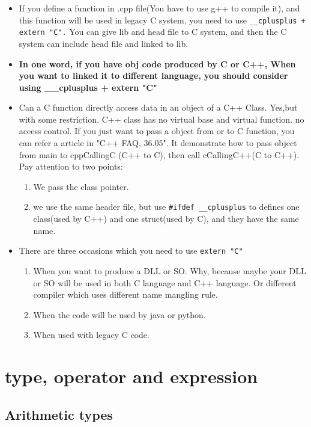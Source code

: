 \documentclass[a4paper,11pt,twoside]{book}
\begin{document}
\begin{itemize}
	\item If you define a function in .cpp file(You have to use g++ to compile it), and this function will be used in legacy C system, you need to use \texttt{\_\_cplusplus + extern "C".}  You can give lib and head file to C system,  and then the C system can include head file and linked to lib.
	
	\item \textbf{In one word, if you have obj code produced by C or C++, When you want to linked it to different language, you should consider using \_\_cplusplus + extern "C" }
	
	\item Can a C function directly access data in an object of a C++ Class. Yes,but with some restriction. C++ class has no virtual base and virtual function. no access control. If you just want to pass a object from or to C function, you can refer a article in "C++ FAQ, 36.05". It demonstrate how to pass object from main to cppCallingC (C++ to C), then call cCallingC++(C to C++). Pay attention to two points:
	\begin{enumerate}
		\item We pass the class pointer.
		\item we use the same header file, but use \texttt{\#ifdef \_\_cplusplus} to defines one class(used by C++) and one struct(used by C), and they have the same name.
	\end{enumerate}
	
	\item There are three occasions which you need to use \texttt{extern "C"}
	\begin{enumerate}
		\item When you want to produce a DLL or SO. Why, because maybe your DLL or SO will be used in both C language and C++ language. Or different compiler which uses different name mangling rule.
		
		\item When the code will be used by java or python.
		
		\item When used with legacy C code.
	\end{enumerate}
\end{itemize}


\chapter{type, operator and expression}

\section{Arithmetic types}
\end{document}

